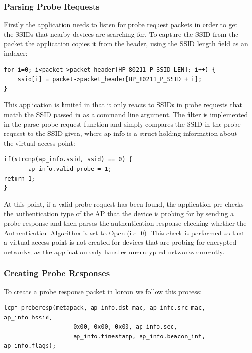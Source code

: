 \subsubsection{Parsing Probe Requests}

Firstly the application needs to listen for probe request packets in order to get the SSIDs that nearby devices are searching for. To capture the SSID from the packet the application copies it from the header, using the SSID length field as an indexer:

\begin{verbatim}
for(i=0; i<packet->packet_header[HP_80211_P_SSID_LEN]; i++) {
	ssid[i] = packet->packet_header[HP_80211_P_SSID + i];
}
\end{verbatim}

This application is limited in that it only reacts to SSIDs in probe requests that match the SSID passed in as a command line argument. The filter is implemented in the parse probe request function and simply compares the SSID in the probe request to the SSID given, where ap info is a struct holding information about the virtual access point:

\begin{verbatim}
if(strcmp(ap_info.ssid, ssid) == 0) {
       ap_info.valid_probe = 1;
return 1;
}
\end{verbatim}

At this point, if a valid probe request has been found, the application pre-checks the authentication type of the AP that the device is probing for by sending a probe response and then parses the authentication response checking whether the Authentication Algorithm is set to Open (i.e. 0). This check is performed so that a virtual access point is not created for devices that are probing for encrypted networks, as the application only handles unencrypted networks currently.

\subsubsection{Creating Probe Responses}

To create a probe response packet in lorcon we follow this process:

\begin{verbatim}
lcpf_proberesp(metapack, ap_info.dst_mac, ap_info.src_mac, ap_info.bssid, 
					0x00, 0x00, 0x00, ap_info.seq, 
					ap_info.timestamp, ap_info.beacon_int, ap_info.flags);
\end{verbatim}

